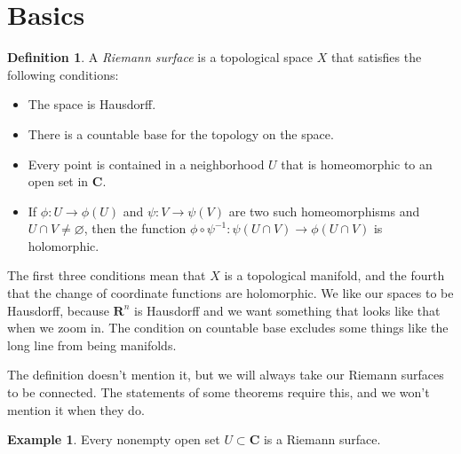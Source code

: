\documentclass[11pt]{article}
\theoremstyle{definition}
\newtheorem{defi}[theo]{Definition}
\newtheorem{exam}[theo]{Example}
\def\empty{\varnothing}
\def\CC{\mathbf{C}}
\def\RR{\mathbf{R}}
\begin{document}
\section{Basics}


\begin{defi}
A \emph{Riemann surface} is a topological space $X$ that satisfies the
following conditions:
\begin{itemize}
\item
The space is Hausdorff.

\item
There is a countable base for the topology on the space.

\item
Every point is contained in
a neighborhood $U$ that is homeomorphic to an open set in $\CC$.

\item
If $\phi : U \to \phi(U)$ and $\psi : V \to \psi(V)$ are two such
homeomorphisms and $U \cap V \not= \empty$, then the function
$\phi\circ\psi^{-1}: \psi(U \cap V) \to \phi(U \cap V)$ is holomorphic.
\end{itemize}
\end{defi}

The first three conditions mean that $X$ is a topological manifold, and the
fourth that the change of coordinate functions are holomorphic.
We like our spaces to be Hausdorff, because $\RR^n$ is Hausdorff and we want
something that looks like that when we zoom in.
The condition on countable base excludes some things like the long line from
being manifolds.

The definition doesn't mention it, but we will always take our Riemann surfaces
to be connected.
The statements of some theorems require this, and we won't mention it when they do.


\begin{exam}
Every nonempty open set $U \subset \CC$ is a Riemann surface.
\end{exam}
\end{document}
